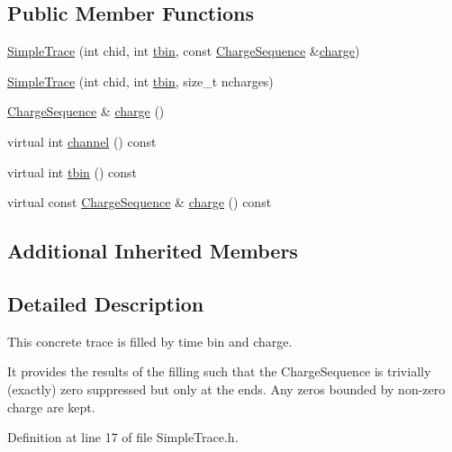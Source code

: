 \subsection*{Public Member Functions}
\begin{DoxyCompactItemize}
\item 
\hyperlink{class_wire_cell_1_1_simple_trace_aabf3ae415f8952a19073c58de4702018}{Simple\+Trace} (int chid, int \hyperlink{class_wire_cell_1_1_simple_trace_a0a345e3606f66b64b2dbb00df7664210}{tbin}, const \hyperlink{class_wire_cell_1_1_i_trace_a3dab103257bc46bfd486966f69836954}{Charge\+Sequence} \&\hyperlink{class_wire_cell_1_1_simple_trace_a2f7bafeb7ae30fa16c72d3c8ae0b64a6}{charge})
\item 
\hyperlink{class_wire_cell_1_1_simple_trace_a8c96686d2523f393352355abce319642}{Simple\+Trace} (int chid, int \hyperlink{class_wire_cell_1_1_simple_trace_a0a345e3606f66b64b2dbb00df7664210}{tbin}, size\+\_\+t ncharges)
\item 
\hyperlink{class_wire_cell_1_1_i_trace_a3dab103257bc46bfd486966f69836954}{Charge\+Sequence} \& \hyperlink{class_wire_cell_1_1_simple_trace_a2f7bafeb7ae30fa16c72d3c8ae0b64a6}{charge} ()
\item 
virtual int \hyperlink{class_wire_cell_1_1_simple_trace_ab88d78ce49eb45b395fb5411905ae010}{channel} () const
\item 
virtual int \hyperlink{class_wire_cell_1_1_simple_trace_a0a345e3606f66b64b2dbb00df7664210}{tbin} () const
\item 
virtual const \hyperlink{class_wire_cell_1_1_i_trace_a3dab103257bc46bfd486966f69836954}{Charge\+Sequence} \& \hyperlink{class_wire_cell_1_1_simple_trace_a961cf4538022571bfcc24895c2c45cb4}{charge} () const
\end{DoxyCompactItemize}
\subsection*{Additional Inherited Members}


\subsection{Detailed Description}
This concrete trace is filled by time bin and charge.

It provides the results of the filling such that the Charge\+Sequence is trivially (exactly) zero suppressed but only at the ends. Any zeros bounded by non-\/zero charge are kept. 

Definition at line 17 of file Simple\+Trace.\+h.



